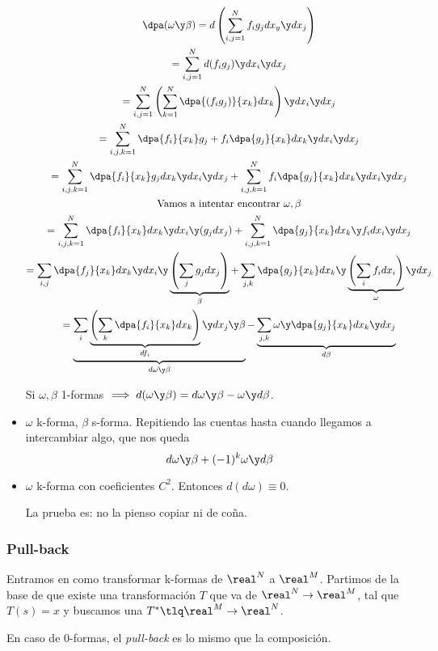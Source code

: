 \begin{itemize}
\begin{gather*}
\dpa(\omega \y \beta) = d\left(\sum_{i,j=1}^N f_ig_jdx_y\y dx_j\right)\\
=\sum_{i,j=1}^N d(f_ig_j) \y dx_i\y dx_j\\
= \sum_{i,j=1}^N \left(\sum_{k=1}^N \dpa{(f_ig_j)}{x_k} dx_k\right)\y dx_i\y dx_j\\
=\sum_{i,j,k=1}^N \dpa{f_i}{x_k}g_j + f_i\dpa{g_j}{x_k}dx_k\y dx_i\y dx_j\\
= \sum_{i,j,k=1}^N \dpa{f_i}{x_k}g_j dx_k\y dx_i\y dx_j + \sum_{i,j,k=1}^N f_i\dpa{g_j}{x_k} dx_k\y dx_i\y dx_j\\
\text{Vamos a intentar encontrar }\omega,\beta\\
= \sum_{i,j,k=1}^N \dpa{f_i}{x_k}dx_k\y dx_i\y(g_jdx_j) + \sum_{i,j,k=1}^N\dpa{g_j}{x_k}dx_k\y f_idx_i \y dx_j \\
= \sum_{i,j} \dpa{f_j}{x_k}dx_k\y dx_i \y \underbrace{\left(\sum_j g_jdx_j\right)}_{\beta} + \sum_{j,k}  \dpa{g_j}{x_k}dx_k\y \underbrace{\left(\sum_i f_idx_i\right)}_{\omega} \y dx_j\\
= \underbrace{\sum_i \underbrace{\left(\sum_k \dpa{f_i}{x_k}dx_k\right)}_{df_i}\y dx_j\y \beta }_{d\omega\y \beta} - \underbrace{\sum_{j,k} \omega \y \dpa{g_j}{x_k}dx_k \y dx_j}_{d\beta}
\end{gather*}

Si $\omega,\beta$ 1-formas $\implies d(\omega \y \beta) = d\omega \y \beta - \omega \y d\beta$.

\item $\omega$ k-forma, $\beta$ s-forma.
Repitiendo las cuentas hasta cuando llegamos a intercambiar algo, que nos queda \[d\omega \y \beta + (-1)^k \omega \y d\beta\]

\item $\omega$ k-forma con coeficientes $C^2$. Entonces $d(d\omega) \equiv 0$.

La prueba es: no la pienso copiar ni de coña.
\end{itemize}


\subsubsection{Pull-back}
Entramos en como transformar k-formas de $\real^N$ a $\real^M$. Partimos de la base de que existe una transformación $T$ que va de $\real^N \to \real^M$, tal que $T(s)=x$ y buscamos una $T^{\ast} \tlq \real^M\to\real^N$.

En caso de 0-formas, el \emph{pull-back} es lo mismo que la composición.

